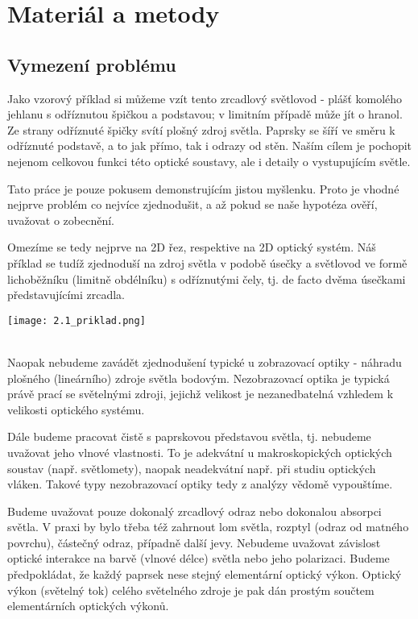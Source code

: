 \chapter{Materiál a metody}

\section{Vymezení problému}


Jako vzorový příklad si můžeme vzít tento zrcadlový světlovod - plášť komolého jehlanu s odříznutou špičkou a podstavou; v limitním případě může jít o hranol. Ze strany odříznuté špičky svítí plošný zdroj světla. Paprsky se šíří ve směru k odříznuté podstavě, a to jak přímo, tak i odrazy od stěn. Naším cílem je pochopit nejenom celkovou funkci této optické soustavy, ale i detaily o vystupujícím světle.

Tato práce je pouze pokusem demonstrujícím jistou myšlenku. Proto je vhodné nejprve problém co nejvíce zjednodušit, a až pokud se naše hypotéza ověří, uvažovat o zobecnění.

Omezíme se tedy nejprve na 2D řez, respektive na 2D optický systém. Náš příklad se tudíž zjednoduší na zdroj světla v podobě úsečky a světlovod ve formě lichoběžníku (limitně obdélníku) s odříznutými čely, tj. de facto dvěma úsečkami představujícími zrcadla.

\begin{center}
    \texttt{[image: 2.1\_priklad.png]}\\
    \\
\end{center}

Naopak nebudeme zavádět zjednodušení typické u zobrazovací optiky - náhradu plošného (lineárního) zdroje světla bodovým. Nezobrazovací optika je typická právě prací se světelnými zdroji, jejichž velikost je nezanedbatelná vzhledem k velikosti optického systému.

Dále budeme pracovat čistě s paprskovou představou světla, tj. nebudeme uvažovat jeho vlnové vlastnosti. To je adekvátní u makroskopických optických soustav (např. světlomety), naopak neadekvátní např. při studiu optických vláken. Takové typy nezobrazovací optiky tedy z analýzy vědomě
vypouštíme.

Budeme uvažovat pouze dokonalý zrcadlový odraz nebo dokonalou absorpci světla. V praxi by bylo třeba též zahrnout lom světla, rozptyl (odraz od matného povrchu), částečný odraz, případně další jevy. Nebudeme uvažovat závislost optické interakce na barvě (vlnové délce) světla nebo jeho polarizaci. Budeme předpokládat, že každý paprsek nese stejný elementární optický výkon. Optický výkon (světelný tok) celého světelného zdroje je pak dán prostým součtem elementárních optických výkonů.

